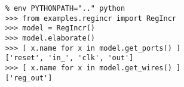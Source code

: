 

  \begin{lstlisting}[gobble=4]
    % cd ${TUTROOT}/build
    % env PYTHONPATH=".." python
    >>> from examples.regincr import RegIncr
    >>> model = RegIncr()
    >>> model.elaborate()
    >>> [ x.name for x in model.get_ports() ]
    ['reset', 'in_', 'clk', 'out']
    >>> [ x.name for x in model.get_wires() ]
    ['reg_out']
\end{lstlisting}

  \captionsetup{justification=centering}
  \label{code-tut3-regincr-import2}

